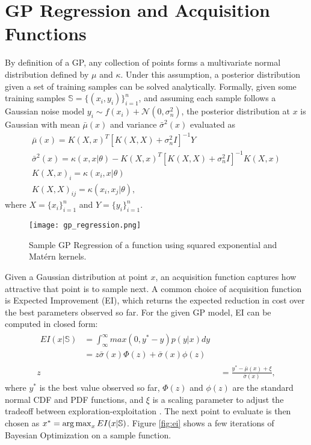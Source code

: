 \section{GP Regression and Acquisition Functions}
\label{gp_acq}
By definition of a GP, any collection of points forms a multivariate normal distribution defined by $\mu$ and $\kappa$. Under this assumption, a posterior distribution given a set of training samples can be solved analytically. Formally, given some training samples $\mathbb{S} = \{(x_i, y_i)\}_{i=1}^n$, and assuming each sample follows a Gaussian noise model $y_i \sim f(x_i) + \mathcal{N}(0, \sigma_n^2)$, the posterior distribution at $x$ is Gaussian with mean $\bar{\mu}(x)$ and variance $\bar{\sigma}^2(x)$ evaluated as
\begin{gather}
  \bar{\mu}(x) = K(X, x)^T[K(X, X) + \sigma_n^2 I]^{-1}Y \\
  \bar{\sigma}^2(x) = \kappa(x, x\vert \theta) - K(X, x)^T[K(X,X) + \sigma_n^2 I]^{-1}K(X,x) \\
  K(X,x)_i = \kappa(x_i, x\vert \theta) \nonumber\\
  K(X,X)_{ij} = \kappa(x_i, x_j\vert \theta) \nonumber,
\end{gather}
where $X = \{x_i\}_{i=1}^n$ and $Y = \{y_i\}_{i=1}^n$. 
\begin{figure}[t]
\centering
\texttt{[image: gp\_regression.png]}
\caption{Sample GP Regression of a function using squared exponential and Matérn kernels.}
\label{fig:gp_regression}
\end{figure}

Given a Gaussian distribution at point $x$, an acquisition function captures how attractive that point is to sample next. A common choice of acquisition function is Expected Improvement (EI), which returns the expected reduction in cost over the best parameters observed so far. For the given GP model, EI can be computed in closed form: 
\begin{align}
  \begin{split}
  EI(x\vert \mathbb{S}) &= \int_\infty^\infty max(0, y^*-y)p(y\vert x)dy\\
    &= z\bar{\sigma}(x)\Phi(z) + \bar{\sigma}(x)\phi(z)
  \end{split}\\
  z &= \frac{y^* - \bar{\mu}(x) + \xi}{\bar{\sigma}(x)}\nonumber,
\end{align}
where $y^*$ is the best value observed so far, $\Phi(z)$ and $\phi(z)$ are the standard normal CDF and PDF functions, and $\xi$ is a scaling parameter to adjust the tradeoff between exploration-exploitation \citep{Lizotte:2008:PBO:1626686}. The next point to evaluate is then chosen as $x^* = \operatorname*{arg\,max}_{x} EI(x \vert \mathbb{S})$. Figure \ref{fig:ei} shows a few iterations of Bayesian Optimization on a sample function.

